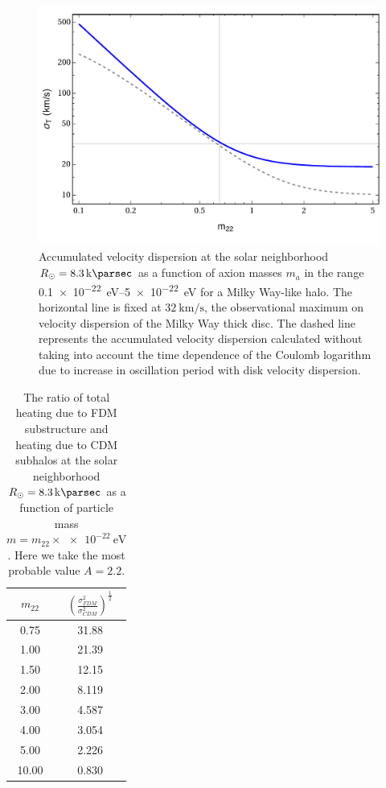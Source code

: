 \documentclass[usenatbib]{mnras}
\begin{document}
\begin{figure}
\includegraphics[width=\columnwidth]{FDM_mass_dep}
\vspace*{-5mm}
\caption{Accumulated velocity dispersion at the solar neighborhood $R_{\odot} = \SI{8.3}{\kilo\parsec}$ as a function of axion masses $m_{a}$ in the range \SIrange{0.1 e-22}{ 5 e-22}{\electronvolt} for a Milky Way-like halo. The horizontal line is fixed at $\SI{32}{\kilo\meter\per\second}$, the observational maximum on velocity dispersion of the Milky Way thick disc. The dashed line represents the accumulated velocity dispersion calculated without taking into account the time dependence of the Coulomb logarithm due to increase in oscillation period with disk velocity dispersion.}
\label{fig:mass_dep_heating}
\end{figure}

\begin{table} 
\begin{center}
 \begin{tabular}{||c c||} 
 \hline
 $m_{22}$ & $\left( \frac{\sigma_{FDM}^2}{\sigma_{CDM}^2} \right)^{\tfrac{1}{2}}$ \\ [2.5ex] 
 \hline\hline
 0.75 & 31.88 \\ 
 \hline
 1.00 & 21.39 \\
 \hline
 1.50 & 12.15 \\
 \hline
 2.00 & 8.119 \\
 \hline
 3.00 & 4.587 \\
 \hline
 4.00 & 3.054 \\
 \hline
 5.00 & 2.226 \\
 \hline
 10.00 & 0.830 \\ [1ex] 
 \hline
\end{tabular}
\end{center}
\caption{The ratio of total heating due to FDM substructure and heating due to CDM subhalos at the solar neighborhood $R_{\odot} = \SI{8.3}{\kilo\parsec}$ as a function of particle mass $m = m_{22} \times \SI{e-22}{\electronvolt}$. Here we take the most probable value $A = 2.2$.}
\label{table:FDM_ratio}
\end{table}
\end{document}
